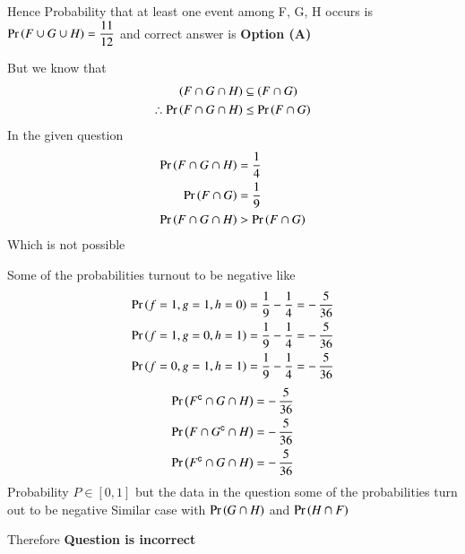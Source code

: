 \documentclass[journal,12pt,twocolumn]{IEEEtran}
\begin{document}
Hence Probability that at least one event among F, G, H occurs is $\Pr\left(F \cup G \cup H\right)=\dfrac{11}{12}$ and correct answer is \textbf{Option (A)}
\null \par
But we know that 
\begin{align*}
(F \cap G \cap H) &\subseteq (F \cap G) \\
\therefore \Pr\left(F \cap G \cap H\right) &\leq \Pr\left(F \cap G\right) 
\end{align*}
In the given question 
\begin{align*}
\Pr\left(F \cap G \cap H\right) &= \dfrac{1}{4} \\
\Pr\left(F\cap G\right)         &= \dfrac{1}{9} \\
\Pr\left(F \cap G \cap H\right) &> \Pr\left(F \cap G\right)
\end{align*}
Which is not possible

Some of the probabilities turnout to be negative like 
\begin{align*}
\Pr\left(f=1,g=1,h=0\right) &= \dfrac{1}{9} - \dfrac{1}{4} = -\,\dfrac{5}{36} \\
\Pr\left(f=1,g=0,h=1\right) &= \dfrac{1}{9} - \dfrac{1}{4} = -\,\dfrac{5}{36} \\
\Pr\left(f=0,g=1,h=1\right) &= \dfrac{1}{9} - \dfrac{1}{4} = -\,\dfrac{5}{36} 
\end{align*}
\begin{align*}
\Pr\left(F^{\mathsf{c}} \cap G \cap H\right)  &= -\,\dfrac{5}{36} \\
\Pr\left(F \cap G^{\mathsf{c}} \cap H\right)  &= -\,\dfrac{5}{36} \\
\Pr\left(F^{\mathsf{c}} \cap G \cap H\right)  &= -\,\dfrac{5}{36}  
\end{align*}
Probability $P\in [0,1]$ but the data in the question some of the probabilities turn out to be negative
Similar case with $\Pr\left(G \cap H\right)$ and $\Pr\left(H \cap F\right)$ 

Therefore \textbf{Question is incorrect}
\end{document}
